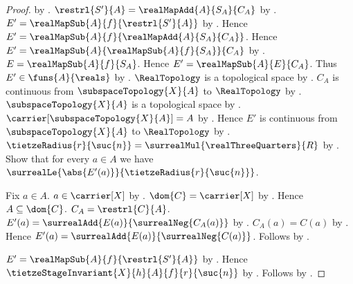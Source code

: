\begin{proof}
        by .
    $\restrl{S'}{A}=\realMapAdd{A}{S_A}{C_A}$
        by .
    $E'=\realMapSub{A}{f}{\restrl{S'}{A}}$
        by .
    Hence $E'=\realMapSub{A}{f}{\realMapAdd{A}{S_A}{C_A}}$.
    Hence $E'=\realMapSub{A}{\realMapSub{A}{f}{S_A}}{C_A}$
        by .
    $E=\realMapSub{A}{f}{S_A}$.
    Hence $E'=\realMapSub{A}{E}{C_A}$.
    Thus $E'\in\funs{A}{\reals}$ by .
    $\RealTopology$ is a topological space
        by .
    $C_A$ is continuous from $\subspaceTopology{X}{A}$ to
        $\RealTopology$
        by .
    $\subspaceTopology{X}{A}$ is a topological space
        by .
    $\carrier[\subspaceTopology{X}{A}]=A$
        by .
    Hence $E'$ is continuous from $\subspaceTopology{X}{A}$ to
        $\RealTopology$
        by .
    $\tietzeRadius{r}{\suc{n}}
        =\surrealMul{\realThreeQuarters}{R}$
        by .
    Show that for every $a\in A$ we have
        $\surrealLe{\abs{E'(a)}}{\tietzeRadius{r}{\suc{n}}}$.
    \begin{subproof}
        Fix $a\in A$.
        $a\in\carrier[X]$ by .
        $\dom{C}=\carrier[X]$ by .
        Hence $A\subseteq\dom{C}$.
        $C_A=\restrl{C}{A}$.
        $E'(a)=\surrealAdd{E(a)}{\surrealNeg{C_A(a)}}$
            by .
        $C_A(a)=C(a)$
            by .
        Hence $E'(a)=\surrealAdd{E(a)}{\surrealNeg{C(a)}}$.
        Follows by \auto.
    \end{subproof}
    $E'=\realMapSub{A}{f}{\restrl{S'}{A}}$
        by .
    Hence $\tietzeStageInvariant{X}{h}{A}{f}{r}{\suc{n}}$
        by .
    Follows by \auto.
\end{proof}


